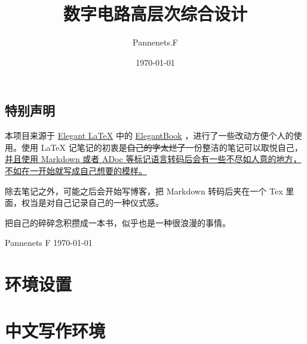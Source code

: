 \documentclass[cn,11pt,chinese,black,simple]{elegantbook}
\title{数字电路高层次综合设计}
\author{Pannenets.F}
\date{\today}
\begin{document}
\maketitle
\frontmatter

\chapter*{特别声明}

本项目来源于 \href{https://github.com/ElegantLaTeX}{Elegant \LaTeX{}} 中的 \href{https://github.com/ElegantLaTeX/ElegantBook}{ElegantBook} ，进行了一些改动方便个人的使用。使用 \LaTeX{} 记笔记的初衷是\sout{自己的字太烂了}一份整洁的笔记可以取悦自己，\uline{并且使用 Markdown 或者 ADoc 等标记语言转码后会有一些不尽如人意的地方，不如在一开始就写成自己想要的模样。}

除去笔记之外，可能之后会开始写博客，把 Markdown 转码后夹在一个 Tex 里面，权当是对自己记录自己的一种仪式感。

\begin{center}
  把自己的碎碎念积攒成一本书，似乎也是一种很浪漫的事情。
\end{center}

\vskip 1.5cm


\begin{flushright}
Pannenets F
\today
\end{flushright}

\tableofcontents

\mainmatter

\part{环境设置}






\part{中文写作环境}




\end{document}
